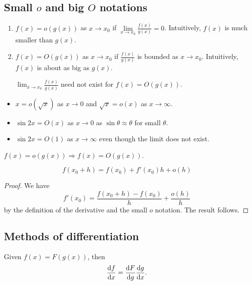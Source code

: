 \documentclass[a4paper]{article}
\begin{document}
  \subsection{Small \texorpdfstring{$o$}{o} and big \texorpdfstring{$O$}{O} notations}
  \begin{defi}\leavevmode
    \begin{enumerate}
      \item $f(x) = o(g(x))$ as $x\to x_0$ if $\lim\limits_{x\to x_0} \frac{f(x)}{g(x)} = 0$. Intuitively, $f(x)$ is much smaller than $g(x)$.
      \item $f(x) = O(g(x))$ as $x\to x_0$ if $\frac{f(x)}{g(x)}$ is bounded as $x\to x_0$. Intuitively, $f(x)$ is about as big as $g(x)$.

        \note $\displaystyle \lim_{x\to x_0} \frac{f(x)}{g(x)}$ need not exist for $f(x)=O(g(x))$.
    \end{enumerate}
  \end{defi}

  \begin{eg}\leavevmode
    \begin{itemize}
      \item $x=o(\sqrt{x})$ as $x\to 0$ and $\sqrt{x} = o(x)$ as $x\to \infty$.
      \item $\sin 2x = O(x)$ as $x\to 0$ as $\sin \theta \approx \theta$ for small $\theta$.
      \item $\sin 2x = O(1)$ as $x\to \infty$ even though the limit does not exist.
    \end{itemize}
  \end{eg}
  \note $f(x)=o(g(x))\Rightarrow f(x) = O(g(x))$.

  \begin{prop}
    \[
      f(x_0 + h) = f(x_0) + f'(x_0)h + o(h)
    \]
  \end{prop}

  \begin{proof}
    We have
    \[
      f'(x_0) = \frac{f(x_0 + h) - f(x_0)}{h} + \frac{o(h)}{h}
    \]
    by the definition of the derivative and the small $o$ notation. The result follows.
  \end{proof}

  \subsection{Methods of differentiation}
  \begin{thm}
    Given $f(x) = F(g(x))$, then
    \[
      \frac{\mathrm{d} f}{\mathrm{d} x} = \frac{\mathrm{d} F}{\mathrm{d} g}\frac{\mathrm{d} g}{\mathrm{d} x}.
    \]
  \end{thm}
\end{document}
